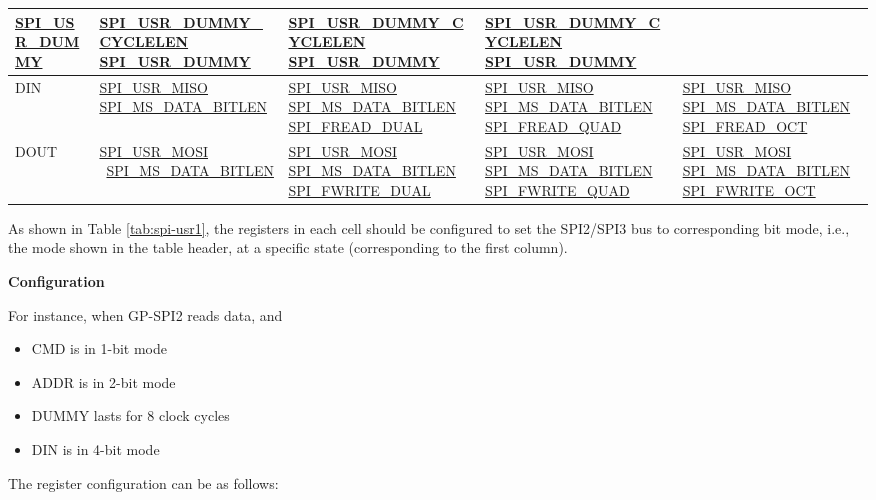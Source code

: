 \documentclass[main\_\_EN.tex]{subfiles}
\begin{document}
\begin{landscape}
\begin{longtable}[c]{ |L{1.3cm}|L{5.2cm}|L{5.2cm}|L{5.2cm}|L{5.2cm}| }
     \hyperref[fielddesc:SPIUSRDUMMY]{SPI\_USR\_DUMMY}
     &\hyperref[fielddesc:SPIUSRDUMMYCYCLELEN]{SPI\_USR\_DUMMY\_CYCLELEN}    \hyperref[fielddesc:SPIUSRDUMMY]{SPI\_USR\_DUMMY} &
    \hyperref[fielddesc:SPIUSRDUMMYCYCLELEN]{SPI\_USR\_DUMMY\_CYCLELEN}    \hyperref[fielddesc:SPIUSRDUMMY]{SPI\_USR\_DUMMY} &\hyperref[fielddesc:SPIUSRDUMMYCYCLELEN]{SPI\_USR\_DUMMY\_CYCLELEN}
     \hyperref[fielddesc:SPIUSRDUMMY]{SPI\_USR\_DUMMY}\\
     \hline
DIN  &\hyperref[fielddesc:SPIUSRMISO]{SPI\_USR\_MISO}
     \hyperref[fielddesc:SPIMSDATABITLEN]{SPI\_MS\_DATA\_BITLEN}
     &\hyperref[fielddesc:SPIUSRMISO]{SPI\_USR\_MISO}
    \hyperref[fielddesc:SPIMSDATABITLEN]{SPI\_MS\_DATA\_BITLEN}
    \hyperref[fielddesc:SPIFREADDUAL]{SPI\_FREAD\_DUAL}
     &\hyperref[fielddesc:SPIUSRMISO]{SPI\_USR\_MISO}
    \hyperref[fielddesc:SPIMSDATABITLEN]{SPI\_MS\_DATA\_BITLEN}
    \hyperref[fielddesc:SPIFREADQUAD]{SPI\_FREAD\_QUAD}&\hyperref[fielddesc:SPIUSRMISO]{SPI\_USR\_MISO}
    \hyperref[fielddesc:SPIMSDATABITLEN]{SPI\_MS\_DATA\_BITLEN}
    \hyperref[fielddesc:SPIFREADOCT]{SPI\_FREAD\_OCT}\\
     \hline
DOUT &\hyperref[fielddesc:SPIUSRMOSI]{SPI\_USR\_MOSI}       \
     \hyperref[fielddesc:SPIMSDATABITLEN]{SPI\_MS\_DATA\_BITLEN}
     &\hyperref[fielddesc:SPIUSRMOSI]{SPI\_USR\_MOSI}
    \hyperref[fielddesc:SPIMSDATABITLEN]{SPI\_MS\_DATA\_BITLEN}      \hyperref[fielddesc:SPIFWRITEDUAL]{SPI\_FWRITE\_DUAL} &
    \hyperref[fielddesc:SPIUSRMOSI]{SPI\_USR\_MOSI}
    \hyperref[fielddesc:SPIMSDATABITLEN]{SPI\_MS\_DATA\_BITLEN}      \hyperref[fielddesc:SPIFWRITEQUAD]{SPI\_FWRITE\_QUAD} & \hyperref[fielddesc:SPIUSRMOSI]{SPI\_USR\_MOSI}
    \hyperref[fielddesc:SPIMSDATABITLEN]{SPI\_MS\_DATA\_BITLEN}      \hyperref[fielddesc:SPIFWRITEOCT]{SPI\_FWRITE\_OCT}\\
     \hline
\end{longtable}
\end{landscape}

As shown in Table \ref{tab:spi-usr1}, the registers in each cell should be configured to set the SPI2/SPI3 bus to corresponding bit mode, i.e., the mode shown in the table header, at a specific state (corresponding to the first column).

\textbf{Configuration}

For instance, when GP-SPI2 reads data, and
\begin{itemize}
    \item CMD is in 1-bit mode
    \item ADDR is in 2-bit mode
    \item DUMMY lasts for 8 clock cycles
    \item DIN is in 4-bit mode
\end{itemize}
The register configuration can be as follows:
\end{document}
